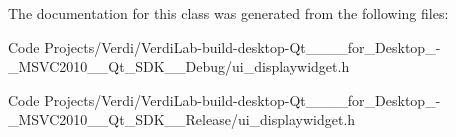 \-The documentation for this class was generated from the following files\-:\begin{DoxyCompactItemize}
\item 
\-Code Projects/\-Verdi/\-Verdi\-Lab-\/build-\/desktop-\/\-Qt\-\_\-\_\-\_\-\_\-for\-\_\-\-Desktop\-\_\--\/\-\_\-\-M\-S\-V\-C2010\-\_\-\-\_\-\-Qt\-\_\-\-S\-D\-K\-\_\-\-\_\-\-Debug/ui\-\_\-displaywidget.\-h\item 
\-Code Projects/\-Verdi/\-Verdi\-Lab-\/build-\/desktop-\/\-Qt\-\_\-\_\-\_\-\_\-for\-\_\-\-Desktop\-\_\--\/\-\_\-\-M\-S\-V\-C2010\-\_\-\-\_\-\-Qt\-\_\-\-S\-D\-K\-\_\-\-\_\-\-Release/ui\-\_\-displaywidget.\-h\end{DoxyCompactItemize}
